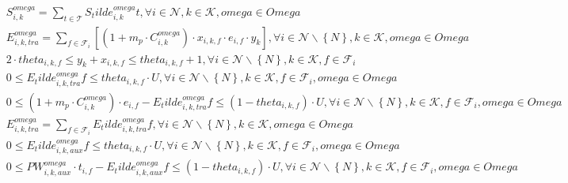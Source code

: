 \begin{align}
  & S_{i , k}^{\mathit{omega}} = \underset{t \in \mathbf{\mathcal{T}}}{\sum} S_tilde_{i , k}^{\mathit{omega}} t , \forall i \in \mathbf{\mathcal{N}} , k \in \mathbf{\mathcal{K}} , \mathit{omega} \in \mathit{Omega} \tag{eq\_0037} \\
  & E_{i , k , \mathit{tra}}^{\mathit{omega}} = \underset{f \in \mathbf{\mathcal{F}}_{i}}{\sum} \left[\left(1 + m_{p} \cdot C_{i , k}^{\mathit{omega}}\right) \cdot x_{i , k , f} \cdot e_{i , f} \cdot y_{k}\right] , \forall i \in \mathbf{\mathcal{N}} \backslash \left\{N\right\} , k \in \mathbf{\mathcal{K}} , \mathit{omega} \in \mathit{Omega} \tag{eq\_0038} \\
  & 2 \cdot \mathit{theta}_{i , k , f} \leq y_{k} + x_{i , k , f} \leq \mathit{theta}_{i , k , f} + 1 , \forall i \in \mathbf{\mathcal{N}} \backslash \left\{N\right\} , k \in \mathbf{\mathcal{K}} , f \in \mathbf{\mathcal{F}}_{i} \tag{eq\_0039} \\
  & 0 \leq E_tilde_{i , k , \mathit{tra}}^{\mathit{omega}} f \leq \mathit{theta}_{i , k , f} \cdot U , \forall i \in \mathbf{\mathcal{N}} \backslash \left\{N\right\} , k \in \mathbf{\mathcal{K}} , f \in \mathbf{\mathcal{F}}_{i} , \mathit{omega} \in \mathit{Omega} \tag{eq\_0040\_a} \\
  & 0 \leq \left(1 + m_{p} \cdot C_{i , k}^{\mathit{omega}}\right) \cdot e_{i , f} - E_tilde_{i , k , \mathit{tra}}^{\mathit{omega}} f \leq \left(1 - \mathit{theta}_{i , k , f}\right) \cdot U , \forall i \in \mathbf{\mathcal{N}} \backslash \left\{N\right\} , k \in \mathbf{\mathcal{K}} , f \in \mathbf{\mathcal{F}}_{i} , \mathit{omega} \in \mathit{Omega} \tag{eq\_0040\_b} \\
  & E_{i , k , \mathit{tra}}^{\mathit{omega}} = \underset{f \in \mathbf{\mathcal{F}}_{i}}{\sum} E_tilde_{i , k , \mathit{tra}}^{\mathit{omega}} f , \forall i \in \mathbf{\mathcal{N}} \backslash \left\{N\right\} , k \in \mathbf{\mathcal{K}} , \mathit{omega} \in \mathit{Omega} \tag{eq\_0041} \\
  & 0 \leq E_tilde_{i , k , \mathit{aux}}^{\mathit{omega}} f \leq \mathit{theta}_{i , k , f} \cdot U , \forall i \in \mathbf{\mathcal{N}} \backslash \left\{N\right\} , k \in \mathbf{\mathcal{K}} , f \in \mathbf{\mathcal{F}}_{i} , \mathit{omega} \in \mathit{Omega} \tag{eq\_0042\_a} \\
  & 0 \leq \mathit{PW}_{i , k , \mathit{aux}}^{\mathit{omega}} \cdot t_{i , f} - E_tilde_{i , k , \mathit{aux}}^{\mathit{omega}} f \leq \left(1 - \mathit{theta}_{i , k , f}\right) \cdot U , \forall i \in \mathbf{\mathcal{N}} \backslash \left\{N\right\} , k \in \mathbf{\mathcal{K}} , f \in \mathbf{\mathcal{F}}_{i} , \mathit{omega} \in \mathit{Omega} \tag{eq\_0042\_b} \\

\end{align}
